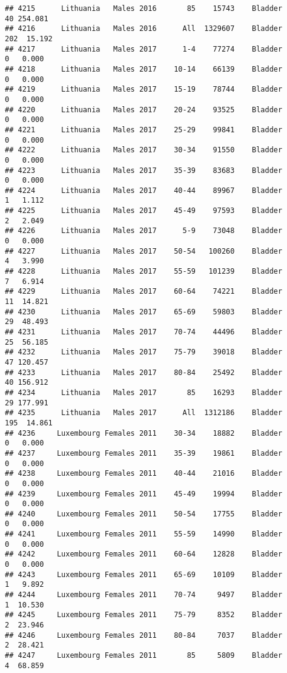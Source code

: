 \documentclass[
]{article}
\begin{document}
\begin{verbatim}
## 4215      Lithuania   Males 2016       85    15743    Bladder     40 254.081
## 4216      Lithuania   Males 2016      All  1329607    Bladder    202  15.192
## 4217      Lithuania   Males 2017      1-4    77274    Bladder      0   0.000
## 4218      Lithuania   Males 2017    10-14    66139    Bladder      0   0.000
## 4219      Lithuania   Males 2017    15-19    78744    Bladder      0   0.000
## 4220      Lithuania   Males 2017    20-24    93525    Bladder      0   0.000
## 4221      Lithuania   Males 2017    25-29    99841    Bladder      0   0.000
## 4222      Lithuania   Males 2017    30-34    91550    Bladder      0   0.000
## 4223      Lithuania   Males 2017    35-39    83683    Bladder      0   0.000
## 4224      Lithuania   Males 2017    40-44    89967    Bladder      1   1.112
## 4225      Lithuania   Males 2017    45-49    97593    Bladder      2   2.049
## 4226      Lithuania   Males 2017      5-9    73048    Bladder      0   0.000
## 4227      Lithuania   Males 2017    50-54   100260    Bladder      4   3.990
## 4228      Lithuania   Males 2017    55-59   101239    Bladder      7   6.914
## 4229      Lithuania   Males 2017    60-64    74221    Bladder     11  14.821
## 4230      Lithuania   Males 2017    65-69    59803    Bladder     29  48.493
## 4231      Lithuania   Males 2017    70-74    44496    Bladder     25  56.185
## 4232      Lithuania   Males 2017    75-79    39018    Bladder     47 120.457
## 4233      Lithuania   Males 2017    80-84    25492    Bladder     40 156.912
## 4234      Lithuania   Males 2017       85    16293    Bladder     29 177.991
## 4235      Lithuania   Males 2017      All  1312186    Bladder    195  14.861
## 4236     Luxembourg Females 2011    30-34    18882    Bladder      0   0.000
## 4237     Luxembourg Females 2011    35-39    19861    Bladder      0   0.000
## 4238     Luxembourg Females 2011    40-44    21016    Bladder      0   0.000
## 4239     Luxembourg Females 2011    45-49    19994    Bladder      0   0.000
## 4240     Luxembourg Females 2011    50-54    17755    Bladder      0   0.000
## 4241     Luxembourg Females 2011    55-59    14990    Bladder      0   0.000
## 4242     Luxembourg Females 2011    60-64    12828    Bladder      0   0.000
## 4243     Luxembourg Females 2011    65-69    10109    Bladder      1   9.892
## 4244     Luxembourg Females 2011    70-74     9497    Bladder      1  10.530
## 4245     Luxembourg Females 2011    75-79     8352    Bladder      2  23.946
## 4246     Luxembourg Females 2011    80-84     7037    Bladder      2  28.421
## 4247     Luxembourg Females 2011       85     5809    Bladder      4  68.859

\end{verbatim}
\end{document}
